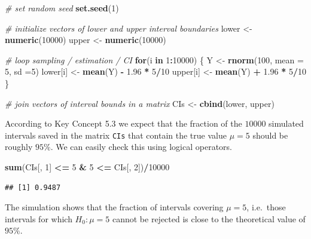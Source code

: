 \documentclass[]{book}
\newenvironment{Shaded}{\begin{snugshade}}{\end{snugshade}}
\newcommand{\KeywordTok}[1]{\textcolor[rgb]{0.13,0.29,0.53}{\textbf{#1}}}
\newcommand{\DataTypeTok}[1]{\textcolor[rgb]{0.13,0.29,0.53}{#1}}
\newcommand{\DecValTok}[1]{\textcolor[rgb]{0.00,0.00,0.81}{#1}}
\newcommand{\FloatTok}[1]{\textcolor[rgb]{0.00,0.00,0.81}{#1}}
\newcommand{\StringTok}[1]{\textcolor[rgb]{0.31,0.60,0.02}{#1}}
\newcommand{\CommentTok}[1]{\textcolor[rgb]{0.56,0.35,0.01}{\textit{#1}}}
\newcommand{\ControlFlowTok}[1]{\textcolor[rgb]{0.13,0.29,0.53}{\textbf{#1}}}
\newcommand{\OperatorTok}[1]{\textcolor[rgb]{0.81,0.36,0.00}{\textbf{#1}}}
\newcommand{\NormalTok}[1]{#1}
\theoremstyle{definition}
\theoremstyle{definition}
\theoremstyle{definition}
\theoremstyle{remark}
\begin{document}
\begin{Shaded}
\begin{Highlighting}[]
\CommentTok{# set random seed}
\KeywordTok{set.seed}\NormalTok{(}\DecValTok{1}\NormalTok{)}

\CommentTok{# initialize vectors of lower and upper interval boundaries}
\NormalTok{lower <-}\StringTok{ }\KeywordTok{numeric}\NormalTok{(}\DecValTok{10000}\NormalTok{)}
\NormalTok{upper <-}\StringTok{ }\KeywordTok{numeric}\NormalTok{(}\DecValTok{10000}\NormalTok{)}

\CommentTok{# loop sampling / estimation / CI}
\ControlFlowTok{for}\NormalTok{(i }\ControlFlowTok{in} \DecValTok{1}\OperatorTok{:}\DecValTok{10000}\NormalTok{) \{}
\NormalTok{  Y <-}\StringTok{ }\KeywordTok{rnorm}\NormalTok{(}\DecValTok{100}\NormalTok{, }\DataTypeTok{mean =} \DecValTok{5}\NormalTok{, }\DataTypeTok{sd =}\DecValTok{5}\NormalTok{)}
\NormalTok{  lower[i] <-}\StringTok{ }\KeywordTok{mean}\NormalTok{(Y) }\OperatorTok{-}\StringTok{ }\FloatTok{1.96} \OperatorTok{*}\StringTok{ }\DecValTok{5}\OperatorTok{/}\DecValTok{10}
\NormalTok{  upper[i] <-}\StringTok{ }\KeywordTok{mean}\NormalTok{(Y) }\OperatorTok{+}\StringTok{ }\FloatTok{1.96} \OperatorTok{*}\StringTok{ }\DecValTok{5}\OperatorTok{/}\DecValTok{10}
\NormalTok{\}}

\CommentTok{# join vectors of interval bounds in a matrix}
\NormalTok{CIs <-}\StringTok{ }\KeywordTok{cbind}\NormalTok{(lower, upper)}
\end{Highlighting}
\end{Shaded}

According to Key Concept 5.3 we expect that the fraction of the
\(10000\) simulated intervals saved in the matrix \texttt{CIs} that
contain the true value \(\mu=5\) should be roughly \(95\%\). We can
easily check this using logical operators.

\begin{Shaded}
\begin{Highlighting}[]
\KeywordTok{sum}\NormalTok{(CIs[, }\DecValTok{1}\NormalTok{] }\OperatorTok{<=}\StringTok{ }\DecValTok{5} \OperatorTok{&}\StringTok{ }\DecValTok{5} \OperatorTok{<=}\StringTok{ }\NormalTok{CIs[, }\DecValTok{2}\NormalTok{])}\OperatorTok{/}\DecValTok{10000}
\end{Highlighting}
\end{Shaded}

\begin{verbatim}
## [1] 0.9487
\end{verbatim}

The simulation shows that the fraction of intervals covering \(\mu=5\),
i.e.~those intervals for which \(H_0: \mu = 5\) cannot be rejected is
close to the theoretical value of \(95\%\).
\end{document}

